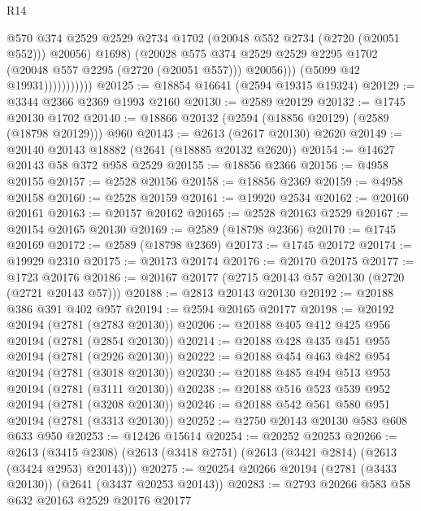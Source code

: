 \begin{lexlean}{R14}
\begin{coremodule}
                                @570
                                @374
                                @2529
                                @2529
                                @2734
                                @1702
                                (@20048 @552 @2734 (@2720 (@20051 @552)))
                                @20056)
                              @1698)
                            (@20028
                              @575
                              @374
                              @2529
                              @2529
                              @2295
                              @1702
                              (@20048 @557 @2295 (@2720 (@20051 @557)))
                              @20056)))
                        (@5099 @42 @19931)))))))))))
@20125 := @18854 @16641 (@2594 @19315 @19324)
@20129 := @3344 @2366 @2369 @1993 @2160
@20130 := @2589 @20129
@20132 := @1745 @20130 @1702
@20140 := @18866 @20132 (@2594 (@18856 @20129) (@2589 (@18798 @20129))) @960
@20143 := @2613 (@2617 @20130) @2620
@20149 := @20140 @20143 @18882 (@2641 (@18885 @20132 @2620))
@20154 := @14627 @20143 @58 @372 @958 @2529
@20155 := @18856 @2366
@20156 := @4958 @20155
@20157 := @2528 @20156
@20158 := @18856 @2369
@20159 := @4958 @20158
@20160 := @2528 @20159
@20161 := @19920 @2534
@20162 := @20160 @20161
@20163 := @20157 @20162
@20165 := @2528 @20163 @2529
@20167 := @20154 @20165 @20130
@20169 := @2589 (@18798 @2366)
@20170 := @1745 @20169
@20172 := @2589 (@18798 @2369)
@20173 := @1745 @20172
@20174 := @19929 @2310
@20175 := @20173 @20174
@20176 := @20170 @20175
@20177 := @1723 @20176
@20186 := @20167 @20177 (@2715 @20143 @57 @20130 (@2720 (@2721 @20143 @57)))
@20188 := @2813 @20143 @20130
@20192 := @20188 @386 @391 @402 @957
@20194 := @2594 @20165 @20177
@20198 := @20192 @20194 (@2781 (@2783 @20130))
@20206 := @20188 @405 @412 @425 @956 @20194 (@2781 (@2854 @20130))
@20214 := @20188 @428 @435 @451 @955 @20194 (@2781 (@2926 @20130))
@20222 := @20188 @454 @463 @482 @954 @20194 (@2781 (@3018 @20130))
@20230 := @20188 @485 @494 @513 @953 @20194 (@2781 (@3111 @20130))
@20238 := @20188 @516 @523 @539 @952 @20194 (@2781 (@3208 @20130))
@20246 := @20188 @542 @561 @580 @951 @20194 (@2781 (@3313 @20130))
@20252 := @2750 @20143 @20130 @583 @608 @633 @950
@20253 := @12426 @15614
@20254 := @20252 @20253
@20266 := @2613
    (@3415 @2308)
    (@2613 (@3418 @2751) (@2613 (@3421 @2814) (@2613 (@3424 @2953) @20143)))
@20275 := @20254 @20266 @20194 (@2781 (@3433 @20130)) (@2641 (@3437 @20253 @20143))
@20283 := @2793 @20266 @583 @58 @632 @20163 @2529 @20176 @20177

\end{coremodule}
\end{lexlean}
